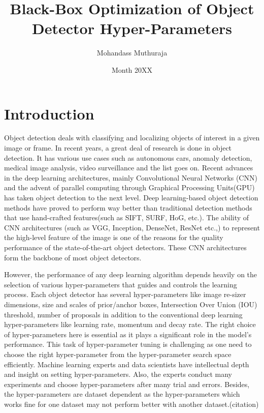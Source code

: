\documentclass[thesis]{mas_proposal}
\title{Black-Box Optimization of Object Detector Hyper-Parameters}
\author{Mohandass Muthuraja}
\date{Month 20XX}
\begin{document}
\maketitle

\pagestyle{plain}

\section{Introduction}
Object detection deals with classifying and localizing objects of interest in a given image or frame. In recent years, a great deal of research is done in object detection. It has various use cases such as autonomous cars, anomaly detection, medical image analysis, video surveillance and the list goes on. Recent advances in the deep learning architectures, mainly Convolutional Neural Networks (CNN) and the advent of parallel computing through Graphical Processing Units(GPU) has taken object detection to the next level. Deep learning-based object detection methods have proved to perform way better than traditional detection methods that use hand-crafted features(such as SIFT, SURF, HoG, etc.). The ability of CNN architectures (such as VGG, Inception, DenseNet, ResNet etc.,) to represent the high-level feature of the image is one of the reasons for the quality performance of the state-of-the-art object detectors. These CNN architectures form the backbone of most object detectors.

However, the performance of any deep learning algorithm depends heavily on the selection of various hyper-parameters that guides and controls the learning process. Each object detector has several hyper-parameters like image re-sizer dimensions, size and scales of prior/anchor boxes, Intersection Over Union (IOU) threshold, number of proposals in addition to the conventional deep learning hyper-parameters like learning rate, momentum and decay rate. The right choice of hyper-parameters here is essential as it plays a significant role in the model's performance. This task of hyper-parameter tuning is challenging as one need to choose the right hyper-parameter from the hyper-parameter search space efficiently. Machine learning experts and data scientists have intellectual depth and insight on setting hyper-parameters. Also, the experts conduct many experiments and choose hyper-parameters after many trial and errors. Besides, the hyper-parameters are dataset dependent as the hyper-parameters which works fine for one dataset may not perform better with another dataset.(citation)
\end{document}

